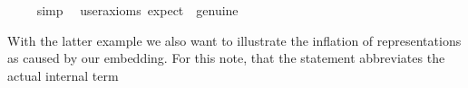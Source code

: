 \begin{isabellebody}
%
\isadelimproof
\ \ \ %
\endisadelimproof
%
\isatagproof
{}\isamarkupfalse%
\ simp\ \isamarkupfalse%
\ {\isacharbrackleft}user{\isacharunderscore}axioms{\isacharcomma}\ expect\ {\isacharequal}\ genuine{\isacharbrackright}\ \ \isamarkupfalse%
\ %
%
\endisatagproof
{\isafoldproof}%
%
\isadelimproof
%
\endisadelimproof
%
\begin{isamarkuptext}%
With the latter example we also want to illustrate the inflation of representations as caused by our
     embedding. For this note, that the statement  abbreviates the
    actual internal term  

\end{isamarkuptext}
\end{isabellebody}
